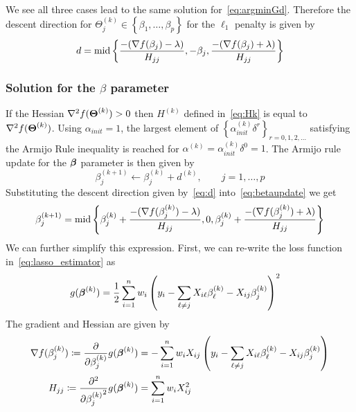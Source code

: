 We see all three cases lead to the same solution for~\eqref{eq:argminGd}. Therefore the descent direction for $\Theta_j^{(k)} \in \left\lbrace \beta_1, \ldots, \beta_p \right\rbrace$ for the $\ell_1$ penalty is given by
\begin{equation}
d = \textrm{{mid}}\left\lbrace \frac{-(\nabla f(\beta_{j}) - \lambda)}{H_{j j}}, -\beta_j ,\frac{-(\nabla f(\beta_{j}) + \lambda)}{H_{j j}} \right\rbrace  \label{eq:d}
\end{equation}

\subsubsection{Solution for the $\beta$ parameter} \label{ap:beta}
If the Hessian $\nabla^2f(\boldsymbol{\Theta}^{(k)}) >0$ then $H^{(k)}$ defined in~\eqref{eq:Hk} is equal to $\nabla^2f(\boldsymbol{\Theta}^{(k)})$. Using $\alpha_{init} = 1$, the largest element of $\left\lbrace \alpha_{init}^{(k)} \delta^r \right\rbrace_{r = 0, 1, 2, \ldots}$ satisfying the Armijo Rule inequality is reached for $\alpha^{(k)} = \alpha_{init}^{(k)}\delta^0 = 1$. The Armijo rule update for the $\boldsymbol{\beta}$ parameter is then given by
\begin{equation}
\beta_j^{(k+1)} \leftarrow \beta_j^{(k)} + d^{(k)}, \qquad j=1, \ldots, p \label{eq:betaupdate}
\end{equation}
Substituting the descent direction given by~\eqref{eq:d} into~\eqref{eq:betaupdate} we get
\begin{equation}
\beta_j^{(k+1)} = \textrm{{mid}}\left\lbrace \beta_j^{(k)}+ \frac{-(\nabla f(\beta_j^{(k)}) - \lambda)}{H_{j j}}, 0,\beta_j^{(k)}+ \frac{-(\nabla f(\beta_j^{(k)}) + \lambda)}{H_{j j}}  \right\rbrace \label{eq:betaMidpoint}
\end{equation}
We can further simplify this expression. First, we can re-write the loss function in~\eqref{eq:lasso_estimator} as
\begin{align}
g(\boldsymbol{\beta}^{(k)}) & = \frac{1}{2} \sum_{i=1}^{n} w_i\left(  y_i - \sum_{\ell \neq j}X_{i\ell} \beta_\ell^{(k)} - X_{ij}\beta_j^{(k)} \right) ^2
\end{align}
The gradient and Hessian are given by
\begin{align}
\nabla f(\beta_j^{(k)}) \coloneqq \frac{\partial}{\partial \beta_j^{(k)}}g(\boldsymbol{\beta}^{(k)}) & = - \sum_{i=1}^{n} w_i X_{ij}\left(  y_i - \sum_{\ell \neq j}X_{i\ell} \beta_\ell^{(k)} - X_{ij}\beta_j^{(k)} \right)  \label{eq:grad}\\
H_{jj} \coloneqq \frac{\partial^2}{\partial {\beta_j^{(k)}}^2}g(\boldsymbol{\beta}^{(k)}) & = \sum_{i=1}^{n} w_i X_{ij}^2  \label{eq:hessian}
\end{align}
